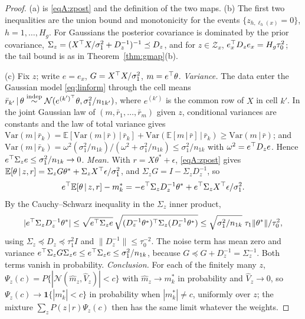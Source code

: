\documentclass[11pt]{article}
\newcommand{\E}{\mathbb{E}}
\newcommand{\Var}{\mathrm{Var}}
\newcommand{\Normal}{\mathcal{N}}
\newcommand{\given}{\,\vert\,}
\newcommand{\indep}{\stackrel{\text{indep}}{\sim}}
\theoremstyle{definition}
\theoremstyle{plain}
\begin{document}
{\begin{proof}
(a) is \eqref{eqA:zpost} and the definition of the two maps. (b) The first two inequalities are the union bound and monotonicity for the events $\{z_{h,\ell_h(x)}=0\}$, $h=1,\dots,H_g$. For Gaussians the posterior covariance is dominated by the prior covariance, $\Sigma_z=(X^{\top} X/\sigma_1^2+D_z^{-1})^{-1}\preceq D_z$, and for $z\in\mathcal Z_x$, $e_x^{\top} D_ze_x=H_g\tau_0^2$; the tail bound is as in Theorem~\ref{thm:gmap}(b).

(c) Fix $z$; write $e=e_x$, $G=X^{\top} X/\sigma_1^2$, $m=e^{\top}\theta$. \emph{Variance.} The data enter the Gaussian model \eqref{eq:linform} through the cell means $\bar r_{k'}\given\theta\indep\Normal(e^{(k')\tr}\theta,\sigma_1^2/n_{1k'})$, where $e^{(k')}$ is the common row of $X$ in cell $k'$. In the joint Gaussian law of $(m,\bar r_1,\dots,\bar r_m)$ given $z$, conditional variances are constants and the law of total variance gives $\Var(m\given\bar r_k)=\E[\Var(m\given\bar r)\given\bar r_k]+\Var(\E[m\given\bar r]\given\bar r_k)\ge\Var(m\given\bar r)$; and $\Var(m\given\bar r_k)=\omega^2(\sigma_1^2/n_{1k})/(\omega^2+\sigma_1^2/n_{1k})\le\sigma_1^2/n_{1k}$ with $\omega^2=e^{\top} D_ze$. Hence $e^{\top}\Sigma_ze\le\sigma_1^2/n_{1k}\to0$. \emph{Mean.} With $r=X\theta^\ast+\epsilon$, \eqref{eqA:zpost} gives $\E[\theta\given z,r]=\Sigma_zG\theta^\ast+\Sigma_zX\tr\epsilon/\sigma_1^2$, and $\Sigma_zG=I-\Sigma_zD_z^{-1}$, so
\[
e\tr\E[\theta\given z,r]-m_k^\ast=-e\tr\Sigma_zD_z^{-1}\theta^\ast+e\tr\Sigma_zX\tr\epsilon/\sigma_1^2 .
\]
By the Cauchy--Schwarz inequality in the $\Sigma_z$ inner product,
\[
|e^{\top}\Sigma_zD_z^{-1}\theta^\ast|\le\sqrt{e^{\top}\Sigma_ze}\,\sqrt{(D_z^{-1}\theta^\ast)^{\top}\Sigma_z(D_z^{-1}\theta^\ast)}\le\sqrt{\sigma_1^2/n_{1k}}\;\tau_1\|\theta^\ast\|/\tau_0^2 ,
\]
using $\Sigma_z\preceq D_z\preceq\tau_1^2I$ and $\|D_z^{-1}\|\le\tau_0^{-2}$. The noise term has mean zero and variance $e^{\top}\Sigma_zG\Sigma_ze\le e^{\top}\Sigma_ze\le\sigma_1^2/n_{1k}$, because $G\preceq G+D_z^{-1}=\Sigma_z^{-1}$. Both terms vanish in probability. \emph{Conclusion.} For each of the finitely many $z$, $\Psi_z(c)=P\{|\Normal(\hat m_z,\hat V_z)|<c\}$ with $\hat m_z\to m_k^\ast$ in probability and $\hat V_z\to0$, so $\Psi_z(c)\to\mathbf 1\{|m_k^\ast|<c\}$ in probability when $|m_k^\ast|\ne c$, uniformly over $z$; the mixture $\sum_zP(z\given r)\Psi_z(c)$ then has the same limit whatever the weights.
\end{proof}

}
\end{document}

